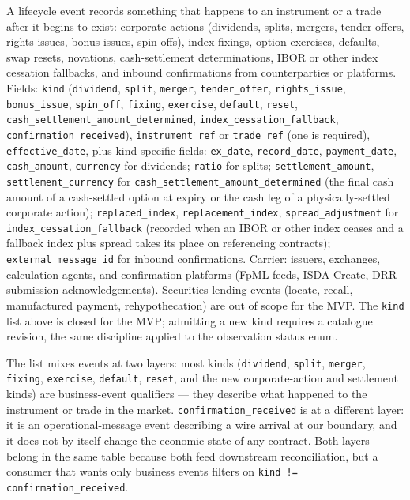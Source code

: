 \documentclass[11pt,a4paper]{article}
\begin{document}
A lifecycle event records something that happens to an instrument or a trade after it begins to exist: corporate actions (dividends, splits, mergers, tender offers, rights issues, bonus issues, spin-offs), index fixings, option exercises, defaults, swap resets, novations, cash-settlement determinations, IBOR or other index cessation fallbacks, and inbound confirmations from counterparties or platforms. Fields: \texttt{kind} (\texttt{dividend}, \texttt{split}, \texttt{merger}, \texttt{tender\_offer}, \texttt{rights\_issue}, \texttt{bonus\_issue}, \texttt{spin\_off}, \texttt{fixing}, \texttt{exercise}, \texttt{default}, \texttt{reset}, \texttt{cash\_settlement\_amount\_determined}, \texttt{index\_cessation\_fallback}, \texttt{confirmation\_received}), \texttt{instrument\_ref} or \texttt{trade\_ref} (one is required), \texttt{effective\_date}, plus kind-specific fields: \texttt{ex\_date}, \texttt{record\_date}, \texttt{payment\_date}, \texttt{cash\_amount}, \texttt{currency} for dividends; \texttt{ratio} for splits; \texttt{settlement\_amount}, \texttt{settlement\_currency} for \texttt{cash\_settlement\_amount\_determined} (the final cash amount of a cash-settled option at expiry or the cash leg of a physically-settled corporate action); \texttt{replaced\_index}, \texttt{replacement\_index}, \texttt{spread\_adjustment} for \texttt{index\_cessation\_fallback} (recorded when an IBOR or other index ceases and a fallback index plus spread takes its place on referencing contracts); \texttt{external\_message\_id} for inbound confirmations. Carrier: issuers, exchanges, calculation agents, and confirmation platforms (FpML feeds, ISDA Create, DRR submission acknowledgements). Securities-lending events (locate, recall, manufactured payment, rehypothecation) are out of scope for the MVP. The \texttt{kind} list above is closed for the MVP; admitting a new kind requires a catalogue revision, the same discipline applied to the observation status enum.

The list mixes events at two layers: most kinds (\texttt{dividend}, \texttt{split}, \texttt{merger}, \texttt{fixing}, \texttt{exercise}, \texttt{default}, \texttt{reset}, and the new corporate-action and settlement kinds) are business-event qualifiers --- they describe what happened to the instrument or trade in the market. \texttt{confirmation\_received} is at a different layer: it is an operational-message event describing a wire arrival at our boundary, and it does not by itself change the economic state of any contract. Both layers belong in the same table because both feed downstream reconciliation, but a consumer that wants only business events filters on \texttt{kind != confirmation\_received}.
\end{document}
